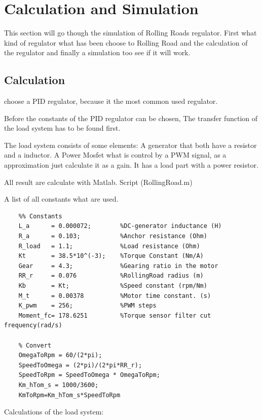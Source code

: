 \newpage
\section{Calculation and Simulation} %
\label{sec:Calculation_and_Simulation}

This section will go though the simulation of Rolling Roads regulator. First what kind of regulator what has been choose to Rolling Road and the calculation of the regulator and finally a simulation too see if it will work.

\subsection{Calculation}

choose a PID regulator, because it the most common used regulator.

Before the constants of the PID regulator can be chosen, The transfer function of the load system has to be found first.

The load system consists of some elements: A generator that both have a resistor and a inductor. A Power Mosfet what is control by a PWM signal, as a approximation just calculate it as a gain. It has a load part with a power resistor.

All result are calculate with Matlab. Script (RollingRoad.m)   

A list of all constants what are used.
\lstset{language=MATLAB}
\begin{lstlisting}
	%% Constants
	L_a      = 0.000072;        %DC-generator inductance (H)
	R_a      = 0.103;           %Anchor resistance (Ohm)
	R_load   = 1.1;             %Load resistance (Ohm)
	Kt       = 38.5*10^(-3);    %Torque Constant (Nm/A)
	Gear     = 4.3;             %Gearing ratio in the motor
	RR_r     = 0.076            %RollingRoad radius (m)
	Kb       = Kt;              %Speed constant (rpm/Nm)
	M_t      = 0.00378          %Motor time constant. (s)
	K_pwm    = 256;             %PWM steps 
	Moment_fc= 178.6251			%Torque sensor filter cut frequency(rad/s)
	
	% Convert 
	OmegaToRpm = 60/(2*pi);
	SpeedToOmega = (2*pi)/(2*pi*RR_r);
	SpeedToRpm = SpeedToOmega * OmegaToRpm;
	Km_hTom_s = 1000/3600;
	KmToRpm=Km_hTom_s*SpeedToRpm
\end{lstlisting} 

Calculations of the load system:

